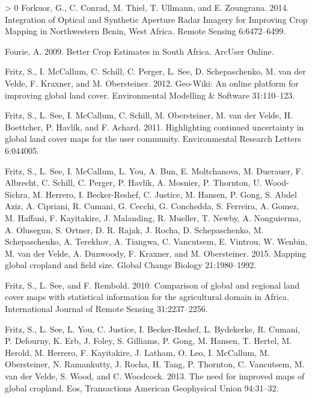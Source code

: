 \documentclass[11pt,a4paper]{article}
\newlength{\cslhangindent}
\newenvironment{CSLReferences}[3] %
 {%
  \setlength{\parindent}{0pt}
  \ifodd #1 \everypar{\setlength{\hangindent}{\cslhangindent}}\ignorespaces\fi
  \ifnum #2 > 0
  \setlength{\parskip}{#2\baselineskip}
  \fi
 }%
 {}
\begin{document}
\begin{CSLReferences}{1}{0}
\leavevmode\hypertarget{ref-forkuorIntegrationOpticalSynthetic2014}{}%
Forkuor, G., C. Conrad, M. Thiel, T. Ullmann, and E. Zoungrana. 2014.
Integration of {Optical} and {Synthetic Aperture Radar Imagery} for
{Improving Crop Mapping} in {Northwestern Benin}, {West Africa}. Remote
Sensing 6:6472--6499.

\leavevmode\hypertarget{ref-FourieBetterCropEstimates2009}{}%
Fourie, A. 2009. Better {Crop Estimates} in {South Africa}. ArcUser
Online.

\leavevmode\hypertarget{ref-FritzGeoWikionlineplatform2012}{}%
Fritz, S., I. McCallum, C. Schill, C. Perger, L. See, D. Schepaschenko,
M. van der Velde, F. Kraxner, and M. Obersteiner. 2012. Geo-{Wiki}: {An}
online platform for improving global land cover. Environmental Modelling
\& Software 31:110--123.

\leavevmode\hypertarget{ref-FritzHighlightingcontinueduncertainty2011}{}%
Fritz, S., L. See, I. McCallum, C. Schill, M. Obersteiner, M. van der
Velde, H. Boettcher, P. Havlík, and F. Achard. 2011. Highlighting
continued uncertainty in global land cover maps for the user community.
Environmental Research Letters 6:044005.

\leavevmode\hypertarget{ref-FritzMappingglobalcropland2015}{}%
Fritz, S., L. See, I. McCallum, L. You, A. Bun, E. Moltchanova, M.
Duerauer, F. Albrecht, C. Schill, C. Perger, P. Havlik, A. Mosnier, P.
Thornton, U. Wood-Sichra, M. Herrero, I. Becker-Reshef, C. Justice, M.
Hansen, P. Gong, S. Abdel Aziz, A. Cipriani, R. Cumani, G. Cecchi, G.
Conchedda, S. Ferreira, A. Gomez, M. Haffani, F. Kayitakire, J.
Malanding, R. Mueller, T. Newby, A. Nonguierma, A. Olusegun, S. Ortner,
D. R. Rajak, J. Rocha, D. Schepaschenko, M. Schepaschenko, A. Terekhov,
A. Tiangwa, C. Vancutsem, E. Vintrou, W. Wenbin, M. van der Velde, A.
Dunwoody, F. Kraxner, and M. Obersteiner. 2015. Mapping global cropland
and field size. Global Change Biology 21:1980--1992.

\leavevmode\hypertarget{ref-FritzComparisonglobalregional2010}{}%
Fritz, S., L. See, and F. Rembold. 2010. Comparison of global and
regional land cover maps with statistical information for the
agricultural domain in {Africa}. International Journal of Remote Sensing
31:2237--2256.

\leavevmode\hypertarget{ref-Fritzneedimprovedmaps2013}{}%
Fritz, S., L. See, L. You, C. Justice, I. Becker-Reshef, L. Bydekerke,
R. Cumani, P. Defourny, K. Erb, J. Foley, S. Gilliams, P. Gong, M.
Hansen, T. Hertel, M. Herold, M. Herrero, F. Kayitakire, J. Latham, O.
Leo, I. McCallum, M. Obersteiner, N. Ramankutty, J. Rocha, H. Tang, P.
Thornton, C. Vancutsem, M. van der Velde, S. Wood, and C. Woodcock.
2013. The need for improved maps of global cropland. Eos, Transactions
American Geophysical Union 94:31--32.


\end{CSLReferences}
\end{document}

